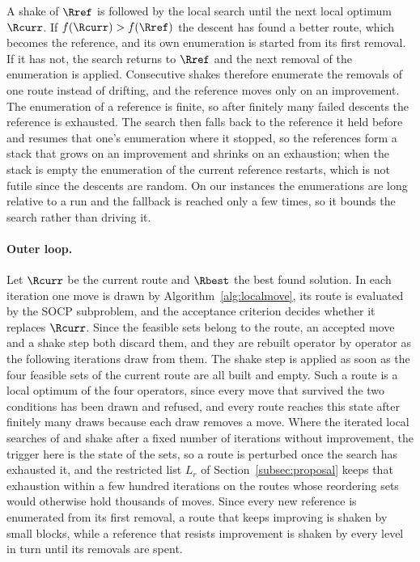 A shake of $\Rref$ is followed by the local search until the next local optimum $\Rcurr$. If $f(\Rcurr) > f(\Rref)$ the descent has found a better route, which becomes the reference, and its own enumeration is started from its first removal. If it has not, the search returns to $\Rref$ and the next removal of the enumeration is applied. Consecutive shakes therefore enumerate the removals of one route instead of drifting, and the reference moves only on an improvement. The enumeration of a reference is finite, so after finitely many failed descents the reference is exhausted. The search then falls back to the reference it held before and resumes that one's enumeration where it stopped, so the references form a stack that grows on an improvement and shrinks on an exhaustion; when the stack is empty the enumeration of the current reference restarts, which is not futile since the descents are random. On our instances the enumerations are long relative to a run and the fallback is reached only a few times, so it bounds the search rather than driving it.

\paragraph{Outer loop.}
Let $\Rcurr$ be the current route and $\Rbest$ the best found solution. In each iteration one move is drawn by Algorithm~\ref{alg:localmove}, its route is evaluated by the SOCP subproblem, and the acceptance criterion decides whether it replaces $\Rcurr$. Since the feasible sets belong to the route, an accepted move and a shake step both discard them, and they are rebuilt operator by operator as the following iterations draw from them. The shake step is applied as soon as the four feasible sets of the current route are all built and empty. Such a route is a local optimum of the four operators, since every move that survived the two conditions has been drawn and refused, and every route reaches this state after finitely many draws because each draw removes a move. Where the iterated local searches of \citep{vansteenwegen2009iterated} and \citep{gunawan2015iterated} shake after a fixed number of iterations without improvement, the trigger here is the state of the sets, so a route is perturbed once the search has exhausted it, and the restricted list $L_r$ of Section~\ref{subsec:proposal} keeps that exhaustion within a few hundred iterations on the routes whose reordering sets would otherwise hold thousands of moves. Since every new reference is enumerated from its first removal, a route that keeps improving is shaken by small blocks, while a reference that resists improvement is shaken by every level in turn until its removals are spent.

